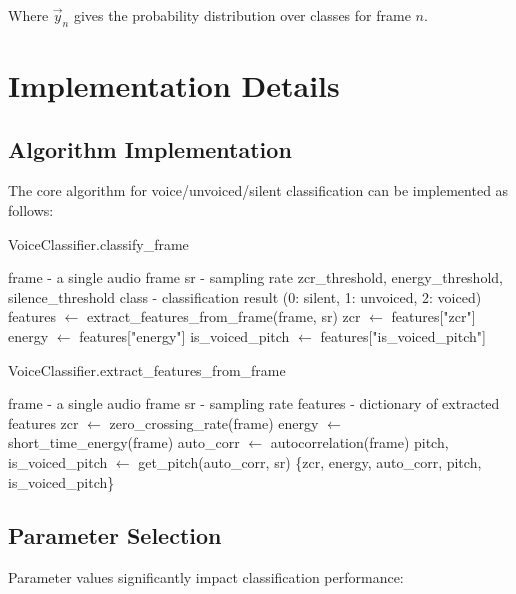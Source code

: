 \documentclass[10pt,journal,compsoc]{IEEEtran}
\begin{document}
Where $\vec{y}_n$ gives the probability distribution over classes for frame $n$.

\section{Implementation Details}

\subsection{Algorithm Implementation}
The core algorithm for voice/unvoiced/silent classification can be implemented as follows:

\begin{algorithm}
\caption{VoiceClassifier.classify\_frame}
\begin{algorithmic}[1]
\REQUIRE frame - a single audio frame
\REQUIRE sr - sampling rate
\REQUIRE zcr\_threshold, energy\_threshold, silence\_threshold
\ENSURE class - classification result (0: silent, 1: unvoiced, 2: voiced)
\STATE features $\leftarrow$ extract\_features\_from\_frame(frame, sr)
\STATE zcr $\leftarrow$ features["zcr"]
\STATE energy $\leftarrow$ features["energy"]
\STATE is\_voiced\_pitch $\leftarrow$ features["is\_voiced\_pitch"]
     
\ENDIF
{}
     
\ELSE
     
\ENDIF
\end{algorithmic}
\end{algorithm}

\begin{algorithm}
\caption{VoiceClassifier.extract\_features\_from\_frame}
\begin{algorithmic}[1]
\REQUIRE frame - a single audio frame
\REQUIRE sr - sampling rate
\ENSURE features - dictionary of extracted features
\STATE zcr $\leftarrow$ zero\_crossing\_rate(frame)
\STATE energy $\leftarrow$ short\_time\_energy(frame)
\STATE auto\_corr $\leftarrow$ autocorrelation(frame)
\STATE pitch, is\_voiced\_pitch $\leftarrow$ get\_pitch(auto\_corr, sr)
\RETURN \{zcr, energy, auto\_corr, pitch, is\_voiced\_pitch\}
\end{algorithmic}
\end{algorithm}

\subsection{Parameter Selection}
Parameter values significantly impact classification performance:
\end{document}
